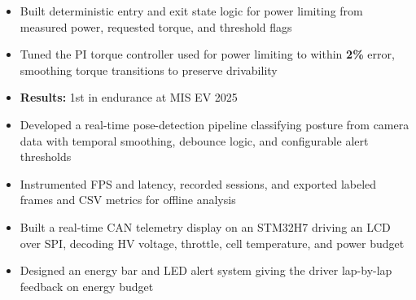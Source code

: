 \documentclass[10pt,letterpaper]{article}
\begin{document}
\entryspace

\orgline{\spartanracing}
\begin{itemize}
  \item Built deterministic entry and exit state logic for power limiting from measured power, requested torque, and threshold flags
  \item Tuned the PI torque controller used for power limiting to within \textbf{2\%} error, smoothing torque transitions to preserve drivability
  \item \textbf{Results:} 1st in endurance at MIS EV 2025
\end{itemize}


\begin{itemize}
  \item Developed a real-time pose-detection pipeline classifying posture from camera data with temporal smoothing, debounce logic, and configurable alert thresholds
  \item Instrumented FPS and latency, recorded sessions, and exported labeled frames and CSV metrics for offline analysis
\end{itemize}

\entryspace

\orgline{\spartanracing}
\begin{itemize}
  \item Built a real-time CAN telemetry display on an STM32H7 driving an LCD over SPI, decoding HV voltage, throttle, cell temperature, and power budget
  \item Designed an energy bar and LED alert system giving the driver lap-by-lap feedback on energy budget
\end{itemize}
\end{document}
